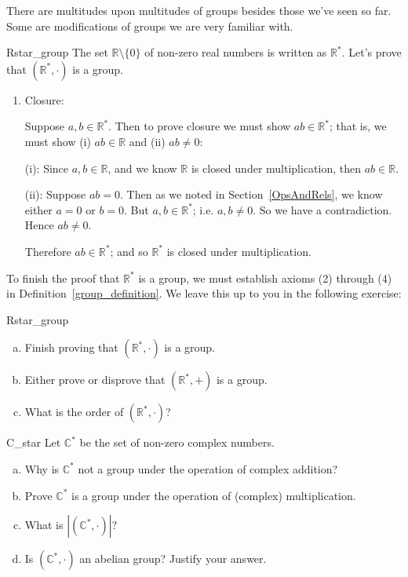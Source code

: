 There are multitudes upon multitudes of groups besides those we've seen so far.  Some are modifications of groups we are very familiar with.  

\begin{example}{Rstar_group}
The set ${\mathbb R} \setminus \{0 \}$ of non-zero real numbers is written as ${\mathbb R}^{\ast}$.  Let's prove that $({\mathbb R}^{\ast}, \cdot)$ is a group.
\begin{enumerate}[(1)]
\item
Closure:  

\noindent
Suppose $a, b \in {\mathbb R}^{\ast}$.  Then to prove closure we must show $ab \in {\mathbb R}^{\ast}$; that is, we must show (i)
$ab \in {\mathbb R}$ and (ii) $ab \neq 0$:

\medskip{}
\noindent
(i):  Since $a, b \in {\mathbb R}$, and we know ${\mathbb R}$ is closed under multiplication, then $ab \in {\mathbb R}$.

\medskip{}
\noindent
(ii):  Suppose $ab = 0$.  Then as we  noted in Section~\ref{OpsAndRels}, we know either $a = 0$ or $b = 0$.  But $a, b \in {\mathbb R}^{\ast}$; i.e. $a, b \neq 0$.  So we have a contradiction.  Hence $ab \neq 0$.

\medskip{}
\noindent
Therefore $ab \in {\mathbb R}^{\ast}$; and so ${\mathbb R}^{\ast}$  is closed under multiplication.
\end{enumerate}
To finish the proof that ${\mathbb R}^{\ast}$ is a group, we must establish axioms (2) through (4) in Definition~\ref{group_definition}. We leave this up to you in the following exercise:

\begin{exercise}{Rstar_group} 
\begin{enumerate}[(a)]
\item
Finish proving that $({\mathbb R}^{\ast}, \cdot)$ is a group.
\item
Either prove or disprove that $({\mathbb R}^{\ast}, +)$ is a group.
\item
What is the order of $({\mathbb R}^{\ast}, \cdot)$?
\end{enumerate}
\end{exercise}
  \end{example}


\begin{exercise}{C_star}
Let ${\mathbb C}^{\ast} $\label{noteCstar} be the set of non-zero complex 
numbers. 
\begin{enumerate}[(a)]
\item
Why is ${\mathbb C}^{\ast}$ not a group under the operation of complex addition?
\item
Prove ${\mathbb C}^{\ast}$ is a group under the operation of (complex) multiplication.
\item
What is $| ({\mathbb C}^{\ast}, \cdot) |$?
\item
Is $({\mathbb C}^{\ast}, \cdot)$ an abelian group?  Justify your answer.
\end{enumerate}  
\end{exercise}

